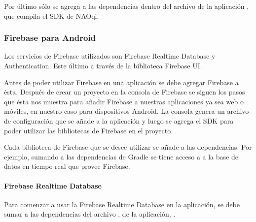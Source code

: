 Por último sólo se agrega a las dependencias dentro del archivo 
de la aplicación , que
compila el SDK de NAOqi.


\subsubsection{Firebase para Android}
\label{\detokenize{dev_docs:firebase-para-android}}


Los servicios de Firebase utilizados son Firebase Realtime Database
y Authentication. Este último a través de la biblioteca Firebase UI.

Antes de poder utilizar Firebase en una aplicación se debe agregar Firebase a ésta. Después de crear un proyecto en la consola 
de Firebase se siguen los pasos que ésta nos muestra
para añadir Firebase a nuestras aplicaciones ya sea web 
o móviles, en nuestro caso para dispositivos Android.
La consola genera un archivo de configuración
que se añade a la aplicación y luego
se agrega el SDK para poder utilizar las bibliotecas de Firebase en el proyecto.

Cada biblioteca de Firebase que se desee utilizar se añade a las dependencias.
Por ejemplo, sumando a las dependencias de Gradle  
se tiene acceso a a la base de datos en tiempo real que provee Firebase.


\paragraph{Firebase Realtime Database}
\label{\detokenize{dev_docs:firebase-realtime-database}}
Para comenzar a usar la Firebase Realtime Database en la aplicación,
se debe sumar a las dependencias del archivo , de la aplicación,
.


